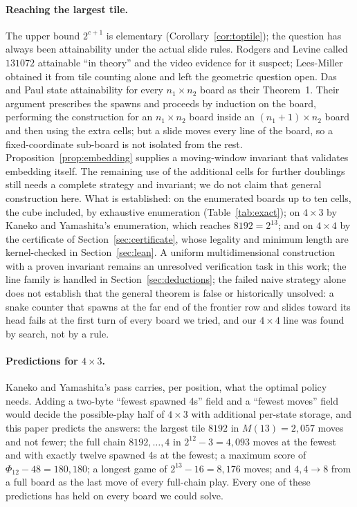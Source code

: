 \documentclass[11pt]{article}
\theoremstyle{definition}
\theoremstyle{remark}
\begin{document}
\paragraph{Reaching the largest tile.} The upper bound $2^{c+1}$ is
elementary (Corollary~\ref{cor:toptile}); the question has always been
attainability under the actual slide rules. Rodgers and Levine
\cite{rodgers2014} called $131072$ attainable ``in theory'' and the video
evidence for it suspect; Lees-Miller \cite{leesmiller2017c} obtained it
from tile counting alone and left the geometric question open. Das and
Paul \cite{daspaul2018} state attainability for every $n_1\times n_2$
board as their Theorem~1. Their argument prescribes the spawns and
proceeds by induction on the board, performing the construction for an
$n_1\times n_2$ board inside an $(n_1+1)\times n_2$ board and then using
the extra cells; but a slide moves every line of the board, so a
fixed-coordinate sub-board is not isolated from the rest.
Proposition~\ref{prop:embedding} supplies a moving-window invariant
that validates embedding itself. The remaining use of the additional
cells for further doublings still needs a complete strategy and invariant;
we do not claim that general construction here. What is established: on the enumerated
boards up to ten cells, the cube included, by exhaustive enumeration
(Table~\ref{tab:exact}); on $4\times3$ by Kaneko and Yamashita's
enumeration, which reaches $8192=2^{13}$; and on $4\times4$ by the
certificate of Section~\ref{sec:certificate}, whose legality and
minimum length are kernel-checked in Section~\ref{sec:lean}. A uniform multidimensional
construction with a proven invariant remains an unresolved verification
task in this work; the line family is handled in Section~\ref{sec:deductions}; the failed naive strategy alone does not establish
that the general theorem is false or historically unsolved: a snake counter
that spawns at the far end of the frontier row and slides toward its head
fails at the first turn of every board we tried, and our $4\times4$ line
was found by search, not by a rule.

\paragraph{Predictions for $4\times3$.} Kaneko and Yamashita's pass
carries, per position, what the optimal policy needs. Adding a two-byte
``fewest spawned 4s'' field and a ``fewest moves'' field would decide
the possible-play half of $4\times3$ with additional per-state storage, and this paper
predicts the answers: the largest tile $8192$ in $M(13)=2{,}057$ moves
and not fewer; the full chain $8192,\dots,4$ in $2^{12}-3=4{,}093$ moves
at the fewest and with exactly twelve spawned 4s at the fewest; a maximum
score of $\Phi_{12}-48=180{,}180$; a longest game of $2^{13}-16=8{,}176$
moves; and $4{,}4\to8$ from a full board as the last move of every
full-chain play. Every one of these predictions has held on every board
we could solve.
\end{document}
